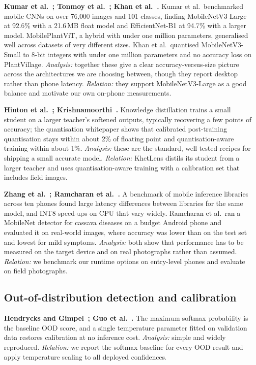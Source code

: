 \textbf{Kumar et al.~\cite{kumar2025benchmark}; Tonmoy et al.~\cite{tonmoy2025mobileplantvit}; Khan et al.~\cite{khan2023edge}.} Kumar et al.\ benchmarked mobile CNNs on over 76,000 images and 101 classes, finding MobileNetV3-Large at 92.6\% with a 21.6\,MB float model and EfficientNet-B1 at 94.7\% with a larger model. MobilePlantViT, a hybrid with under one million parameters, generalised well across datasets of very different sizes. Khan et al.\ quantised MobileNetV3-Small to 8-bit integers with under one million parameters and no accuracy loss on PlantVillage. \emph{Analysis:} together these give a clear accuracy-versus-size picture across the architectures we are choosing between, though they report desktop rather than phone latency. \emph{Relation:} they support MobileNetV3-Large as a good balance and motivate our own on-phone measurements.

\textbf{Hinton et al.~\cite{hinton2015kd}; Krishnamoorthi~\cite{krishnamoorthi2018quant}.} Knowledge distillation trains a small student on a larger teacher's softened outputs, typically recovering a few points of accuracy; the quantisation whitepaper shows that calibrated post-training quantisation stays within about 2\% of floating point and quantisation-aware training within about 1\%. \emph{Analysis:} these are the standard, well-tested recipes for shipping a small accurate model. \emph{Relation:} KhetLens distils its student from a larger teacher and uses quantisation-aware training with a calibration set that includes field images.

\textbf{Zhang et al.~\cite{zhangq2022mobilebench}; Ramcharan et al.~\cite{ramcharan2019cassava}.} A benchmark of mobile inference libraries across ten phones found large latency differences between libraries for the same model, and INT8 speed-ups on CPU that vary widely. Ramcharan et al.\ ran a MobileNet detector for cassava diseases on a budget Android phone and evaluated it on real-world images, where accuracy was lower than on the test set and lowest for mild symptoms. \emph{Analysis:} both show that performance has to be measured on the target device and on real photographs rather than assumed. \emph{Relation:} we benchmark our runtime options on entry-level phones and evaluate on field photographs.

\subsection{Out-of-distribution detection and calibration}
\label{sec:lit-ood}
\textbf{Hendrycks and Gimpel~\cite{hendrycks2017msp}; Guo et al.~\cite{guo2017calibration}.} The maximum softmax probability is the baseline OOD score, and a single temperature parameter fitted on validation data restores calibration at no inference cost. \emph{Analysis:} simple and widely reproduced. \emph{Relation:} we report the softmax baseline for every OOD result and apply temperature scaling to all deployed confidences.

